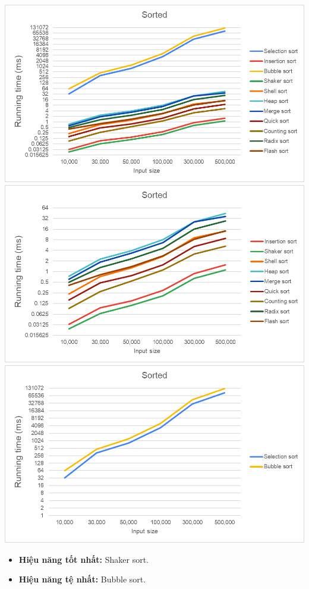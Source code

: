     \includegraphics[width = 1\linewidth]{img/experiment/running time/sorted/1.png}
    \includegraphics[width = 1\linewidth]{img/experiment/running time/sorted/2.png}
    \includegraphics[width = 1\linewidth]{img/experiment/running time/sorted/3.png}

    \begin{itemize}
        \item \textbf{Hiệu năng tốt nhất:} Shaker sort.
        \item \textbf{Hiệu năng tệ nhất:} Bubble sort.
    \end{itemize}    
\newpage
